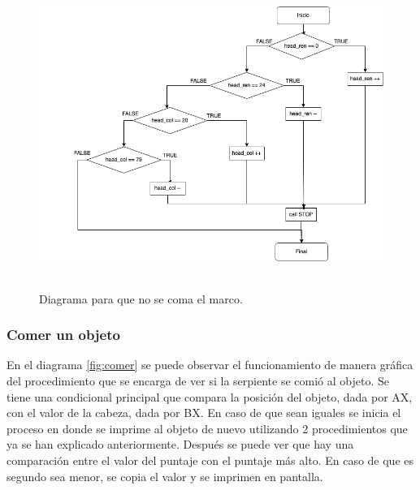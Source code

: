 \documentclass[12pt]{article}
\begin{document}
\begin{figure}
    \centering
    \includegraphics[height = 10cm]{img/diagramas/03DiagramaMarco.png}
    \caption{Diagrama para que no se coma el marco.}
    \label{fig:marco}
\end{figure}

\subsubsection*{Comer un objeto}
En el diagrama \ref{fig:comer} se puede observar el funcionamiento de manera gráfica del procedimiento que se encarga de ver si la serpiente se comió al objeto. Se tiene una condicional principal que compara la posición del objeto, dada por AX, con el valor de la cabeza, dada por BX. En caso de que sean iguales se inicia el proceso en donde se imprime al objeto de nuevo utilizando 2 procedimientos que ya se han explicado anteriormente. Después se puede ver que hay una comparación entre el valor del puntaje con el puntaje más alto. En caso de que es segundo sea menor, se copia el valor y se imprimen en pantalla. 
\end{document}
